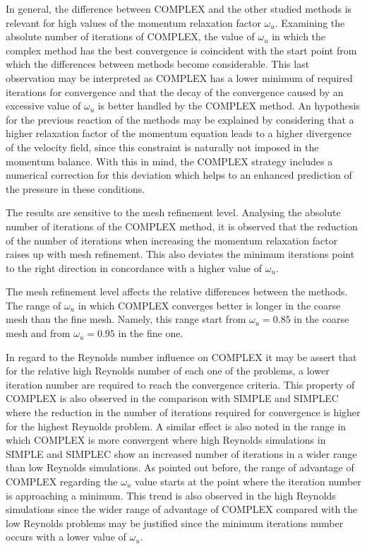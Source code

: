 \documentclass[final,3p,times,11pt,onecolumn]{myElsarticle}
\numberwithin{equation}{section}
\begin{document}
In general, the difference between COMPLEX and the other studied methods is relevant for high values of the momentum relaxation factor $\omega_u$. Examining the absolute number of iterations of COMPLEX, the  value of $\omega_u$ in which the complex method has the best convergence is coincident with the start point from which the differences between methods become considerable. This last observation may be interpreted as COMPLEX has a lower minimum of required iterations for convergence and that the decay of the convergence caused by an excessive value of $\omega_u$ is better handled by the COMPLEX method. An hypothesis for the previous reaction of the methods may be explained by considering that a higher relaxation factor of the momentum equation leads to a higher divergence of the velocity field, since this constraint is naturally not imposed in the momentum balance. With this in mind, the COMPLEX strategy includes a numerical correction for this deviation which helps to an enhanced prediction of the pressure in these conditions.

The results are sensitive to the mesh refinement level. Analysing the absolute number of iterations of the COMPLEX method, it is observed that the reduction of the number of iterations when increasing the momentum relaxation factor raises up with mesh refinement. This also deviates the minimum iterations point to the right direction in concordance with a higher value of $\omega_u$. 

The mesh refinement level affects the relative differences between the methods. The range of $\omega_u$ in which COMPLEX converges better is longer in the coarse mesh than the fine mesh. Namely, this range start from $\omega_u = 0.85$ in the coarse mesh and from $\omega_u = 0.95$ in the fine one.

In regard to the Reynolds number influence on COMPLEX it may be assert that for the relative high Reynolds number of each one of the problems, a lower iteration number are required to reach the convergence criteria. This property of COMPLEX is also observed in the comparison with SIMPLE and SIMPLEC where the reduction in the number of iterations required for convergence is higher for the highest Reynolds problem. A similar effect is also noted in the range in which COMPLEX is more convergent where high Reynolds simulations in SIMPLE and SIMPLEC show an increased number of iterations in a wider range than low Reynolds simulations. As pointed out before, the range of advantage of COMPLEX regarding the $\omega_u$ value starts at the point where the iteration number is approaching a minimum. This trend is also observed in the high Reynolds simulations since the wider range of advantage of COMPLEX compared with the low Reynolds problems may be justified since the minimum iterations number occurs with a lower value of $\omega_u$.
\end{document}
